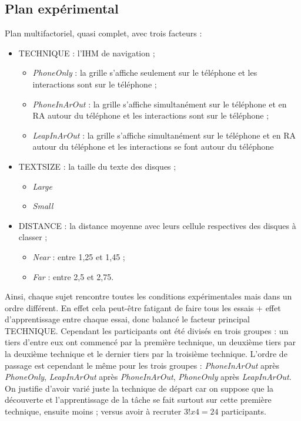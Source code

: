 \subsection{Plan expérimental}
Plan multifactoriel, quasi complet, avec trois facteurs :
\begin{itemize}
  \item \textsc{TECHNIQUE} : l'IHM de navigation ;
  \begin{itemize}
    \item \textit{PhoneOnly} : la grille s'affiche seulement sur le téléphone et les interactions sont sur le téléphone ;
    \item \textit{PhoneInArOut} : la grille s'affiche simultanément sur le téléphone et en RA autour du téléphone et les interactions sont sur le téléphone ;
    \item \textit{LeapInArOut} : la grille s'affiche simultanément sur le téléphone et en RA autour du téléphone et les interactions se font autour du téléphone
  \end{itemize}
  \item \textsc{TEXTSIZE} : la taille du texte des disques ;
  \begin{itemize}
    \item \textit{Large}
    \item \textit{Small}
  \end{itemize}
  \item \textsc{DISTANCE} : la distance moyenne avec leurs cellule respectives des disques à classer ;
  \begin{itemize}
    \item \textit{Near} : entre 1,25 et 1,45 ;
    \item \textit{Far} : entre 2,5 et 2,75.
  \end{itemize}
\end{itemize}

Ainsi, chaque sujet rencontre toutes les conditions expérimentales mais dans un ordre différent. En effet cela peut-être fatigant de faire tous les essais + effet d'apprentissage entre chaque essai, donc balancé le facteur principal \textsc{TECHNIQUE}. Cependant les participants ont été divisés en trois groupes : un tiers d'entre eux ont commencé par la première technique, un deuxième tiers par la deuxième technique et le dernier tiers par la troisième technique. L'ordre de passage est cependant le même pour les trois groupes : \textit{PhoneInArOut} après \textit{PhoneOnly}, \textit{LeapInArOut} après \textit{PhoneInArOut}, \textit{PhoneOnly} après \textit{LeapInArOut}. On justifie d'avoir varié juste la technique de départ car on suppose que la découverte et l'apprentissage de la tâche se fait surtout sur cette première technique, ensuite moins ; versus avoir à recruter $3! x 4 = 24$ participants.

